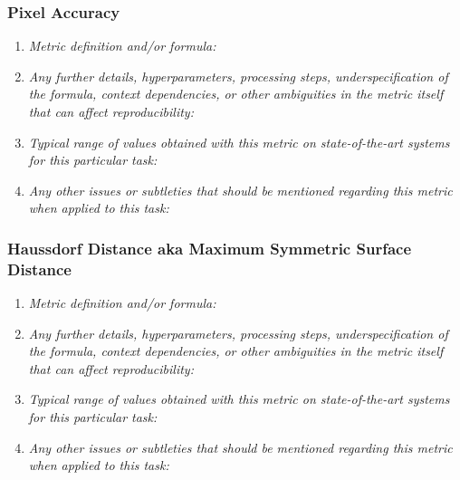 \documentclass[a4paper,11pt]{article}
\begin{document}
        \subsubsection{Pixel Accuracy}
            \begin{enumerate}[label=\alph*.]
                \item \textit{Metric definition and/or formula:}
                \bigskip
                \item \textit{Any further details, hyperparameters, processing steps, underspecification of the formula, context dependencies, or other ambiguities in the metric itself that can affect reproducibility:}
                \bigskip
                \item \textit{Typical range of values obtained with this metric on state-of-the-art systems for this particular task:}
                \bigskip
                \item \textit{Any other issues or subtleties that should be mentioned regarding this metric when applied to this task:}
                \bigskip
            \end{enumerate}
        \subsubsection{Haussdorf Distance aka Maximum Symmetric Surface Distance}
            \begin{enumerate}[label=\alph*.]
                \item \textit{Metric definition and/or formula:}
                \bigskip
                \item \textit{Any further details, hyperparameters, processing steps, underspecification of the formula, context dependencies, or other ambiguities in the metric itself that can affect reproducibility:}
                \bigskip
                \item \textit{Typical range of values obtained with this metric on state-of-the-art systems for this particular task:}
                \bigskip
                \item \textit{Any other issues or subtleties that should be mentioned regarding this metric when applied to this task:}
                \bigskip
            \end{enumerate}
\end{document}

